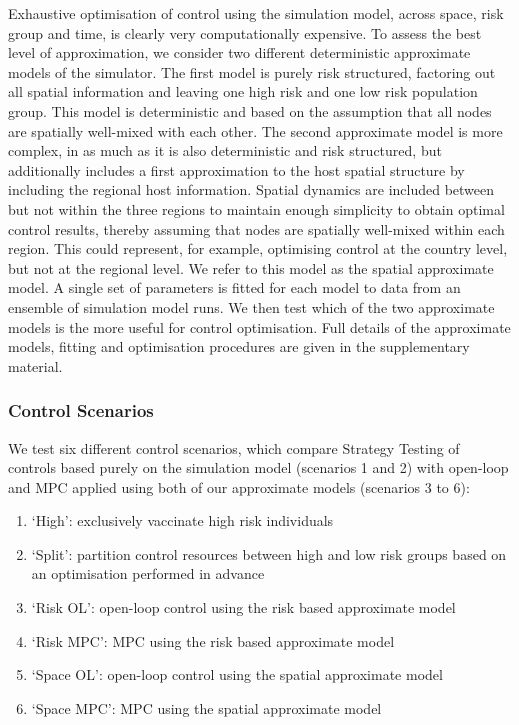Exhaustive optimisation of control using the simulation model, across space, risk group and time, is clearly very computationally expensive. To assess the best level of approximation, we consider two different deterministic approximate models of the simulator. The first model is purely risk structured, factoring out all spatial information and leaving one high risk and one low risk population group. This model is deterministic and based on the assumption that all nodes are spatially well-mixed with each other. The second approximate model is more complex, in as much as it is also deterministic and risk structured, but additionally includes a first approximation to the host spatial structure by including the regional host information. Spatial dynamics are included between but not within the three regions to maintain enough simplicity to obtain optimal control results, thereby assuming that nodes are spatially well-mixed within each region. This could represent, for example, optimising control at the country level, but not at the regional level. We refer to this model as the spatial approximate model. A single set of parameters is fitted for each model to data from an ensemble of simulation model runs. We then test which of the two approximate models is the more useful for control optimisation. Full details of the approximate models, fitting and optimisation procedures are given in the supplementary material.

\subsubsection*{Control Scenarios}

We test six different control scenarios, which compare Strategy Testing of controls based purely on the simulation model (scenarios 1 and 2) with open-loop and MPC applied using both of our approximate models (scenarios 3 to 6):
\begin{enumerate}
    \item{}`High': exclusively vaccinate high risk individuals
    \item{}`Split': partition control resources between high and low risk groups based on an optimisation performed in advance
    \item{}`Risk OL': open-loop control using the risk based approximate model
    \item{}`Risk MPC': MPC using the risk based approximate model
    \item{}`Space OL': open-loop control using the spatial approximate model
    \item{}`Space MPC': MPC using the spatial approximate model
\end{enumerate}

